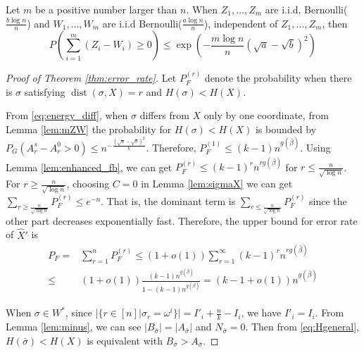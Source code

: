 \documentclass[entropy,article,submit,moreauthors,pdftex]{Definitions/mdpi}
\newcommand{\A}{\frac{a \log n}{n}}
\newcommand{\B}{\frac{b \log n}{n}}
\newcommand{\1}{\mathbbm{1}}
\DeclareMathOperator{\Dist}{dist}
\begin{document}
\begin{Lemma}\label{lem:mZW}
	Let $m$ be a positive number larger than $n$.
	When $Z_1, \dots, Z_m$ are i.i.d. Bernoulli($\B$) and $W_1, \dots, W_m$ are i.i.d Bernoulli($\A$), independent of $Z_1, \dots, Z_m$,
	then
	\begin{equation}
	P(\sum_{i=1}^m (Z_i  - W_i) \geq 0) \leq \exp(-\frac{m \log n}{n}(\sqrt{a} - \sqrt{b})^2)
	\end{equation}
\end{Lemma}
\begin{proof}[Proof of Theorem \ref{thm:error_rate}]

	Let $P_F^{(r)}$ denote the probability when there is $\sigma$ satisfying $\Dist(\sigma, X) = r$ and $H(\sigma) < H(X)$.
	
	From \eqref{eq:energy_diff}, when $\sigma$ differs from $X$ only by one coordinate, from Lemma \ref{lem:mZW} the probability for $H(\sigma) < H(X)$ is
	bounded by $P_G(A_r^s - A_r^0 > 0) \leq n^{-\frac{(\sqrt{a}-\sqrt{b})^2}{k}}$. Therefore, $P_F^{(1)}  \leq (k-1)n^{g(\bar{\beta})}$.
	Using Lemma \ref{lem:enhanced_fb}, we can get $P_F^{(r)} \leq (k-1)^r n^{rg(\bar{\beta})}$ for $ r \leq \frac{n}{\sqrt{\log n}}$.
	For $ r \geq \frac{n}{\sqrt{\log n}}$, choosing $C=0$ in Lemma \ref{lem:sigmaX} we can get $\sum_{r\geq \frac{n}{\sqrt{\log n}}}P_F^{(r)} \leq e^{-n}$.
	That is, the dominant term is $\sum_{r\leq \frac{n}{\sqrt{\log n}}}P_F^{(r)}$ since the other part decreases exponentially fast.
	Therefore, the upper bound for error rate of $\hat{X}'$ is
	\begin{align*}
	P_F = & \sum_{r=1}^n P_F^{(r)} \leq (1+o(1)) \sum_{r=1}^{\infty} (k-1)^r n^{rg(\bar{\beta})}\\
	\leq & (1+o(1))\frac{(k-1) n^{g(\bar{\beta})}}{1-(k-1) n^{g(\bar{\beta})}} = (k-1+o(1))n^{g(\bar{\beta})}
	\end{align*}
	
When $\sigma \in W^*$, since $|\{r\in [n] | \sigma_r = \omega^i \}| = I'_i + \frac{n}{k} - I_i $, we have $I'_i = I_i$.
From Lemma \ref{lem:minus}, we can see  $|B_{\bar{\sigma}}| = |A_{\bar{\sigma}}|$
and $N_{\bar{\sigma}} = 0$. Then from \eqref{eq:Hgeneral}, $H(\bar{\sigma}) < H(X)$ is equivalent with $B_{\bar{\sigma}} > A_{\bar{\sigma}}$.


\end{proof}
\end{document}
